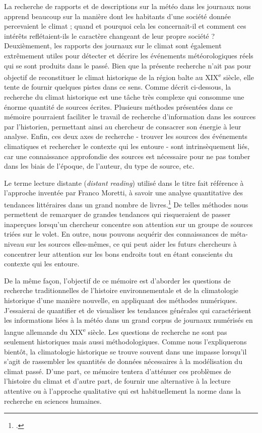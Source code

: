 \documentclass[a4paper,twoside,12pt]{article}
\begin{document}
La recherche de rapports et de descriptions sur la météo dans les journaux nous apprend beaucoup sur la manière dont les habitants d'une société donnée percevaient le climat ; quand et pourquoi cela les concernait-il et comment ces intérêts reflétaient-ils le caractère changeant de leur propre société ? Deuxièmement, les rapports des journaux sur le climat sont également extrêmement utiles pour détecter et décrire les événements météorologiques réels qui se sont produits dans le passé. Bien que la présente recherche n'ait pas pour objectif de reconstituer le climat historique de la région balte au XIX\textsuperscript{e} siècle, elle tente de fournir quelques pistes dans ce sens. Comme décrit ci-dessous, la recherche du climat historique est une tâche très complexe qui consomme une énorme quantité de sources écrites. Plusieurs méthodes présentées dans ce mémoire pourraient faciliter le travail de recherche d'information dans les sources par l'historien, permettant ainsi au chercheur de consacrer son énergie à leur analyse. Enfin, ces deux axes de recherche - trouver les sources des événements climatiques et rechercher le contexte qui les entoure - sont intrinsèquement liés, car une connaissance approfondie des sources est nécessaire pour ne pas tomber dans les biais de l'époque, de l'auteur, du type de source, etc.

Le terme \og lecture distante \fg{} (\textit{distant reading}) utilisé dans le titre fait référence à l'approche inventée par Franco Moretti, à savoir une analyse quantitative des tendances littéraires dans un grand nombre de livres.\footcite[][]{moretti_distant_2013} De telles méthodes nous permettent de remarquer de grandes tendances qui risqueraient de passer inaperçues lorsqu'un chercheur concentre son attention sur un groupe de sources triées sur le volet. En outre, nous pouvons acquérir des connaissances de méta-niveau sur les sources elles-mêmes, ce qui peut aider les futurs chercheurs à concentrer leur attention sur les bons endroits tout en étant conscients du contexte qui les entoure. 

De la même façon, l'objectif de ce mémoire est d'aborder les questions de recherche traditionnelles de l'histoire environnementale et de la climatologie historique d'une manière nouvelle, en appliquant des méthodes numériques. J'essaierai de quantifier et de visualiser les tendances générales qui caractérisent les informations liées à la météo dans un grand corpus de journaux numérisés en langue allemande du XIX\textsuperscript{e} siècle. Les questions de recherche ne sont pas seulement historiques mais aussi méthodologiques. Comme nous l'expliquerons bientôt, la climatologie historique se trouve souvent dans une impasse lorsqu'il s'agit de rassembler les quantités de données nécessaires à la modélisation du climat passé. D'une part, ce mémoire tentera d'atténuer ces problèmes de l'histoire du climat et d'autre part, de fournir une alternative à la \og lecture attentive \fg{} ou à l'approche qualitative qui est habituellement la norme dans la recherche en sciences humaines.
\end{document}
